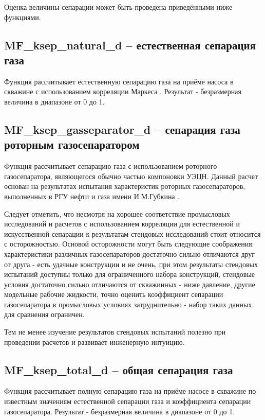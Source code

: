 Оценка величины сепарации может быть проведена приведёнными ниже функциями.

\subsection{MF\_ksep\_natural\_d – естественная сепарация газа}
Функция рассчитывает естественную сепарацию газа на приёме насоса в скважине с использованием корреляции Маркеса \cite{Marquez_2003} . Результат - безразмерная величина в диапазоне от 0 до 1. 


\subsection{MF\_ksep\_gasseparator\_d – сепарация газа роторным газосепаратором}
Функция рассчитывает сепарацию газа с использованием роторного газосепаратора, являющегося обычно частью компоновки УЭЦН. Данный расчет основан на результатах испытания характеристик роторных газосепараторов, выполненных в РГУ нефти и газа имени И.М.Губкина \cite{SPE_117415_2008}. 

Следует отметить, что несмотря на хорошее соответствие промысловых исследований и расчетов с использованием корреляции для естественной и искусственной сепарации \cite{SPE_117415_2008} к результатам стендовых исследований стоит относится с осторожностью. Основой осторожности могут быть следующие соображения: характеристики различных газосепараторов достаточно сильно отличаются друг от друга - есть удачные конструкции и не очень, при этом результаты стендовых испытаний доступны только для ограниченного набора конструкций, стендовые условия достаточно сильно отличаются от скважинных - ниже давление, другие модельные рабочие жидкости, точно оценить коэффициент сепарации газосепаратора в промысловых условиях затруднительно - набор таких данных для сравнения ограничен. 

Тем не менее изучение результатов стендовых испытаний полезно при проведении расчетов и развивает инженерную интуицию. 



\subsection{MF\_ksep\_total\_d – общая сепарация газа}

Функция рассчитывает полную сепарацию газа на приёме насосе в скважине по известным значениям естественной сепарации газа и коэффициента сепарации газосепаратора. Результат - безразмерная величина в диапазоне от 0 до 1. 

